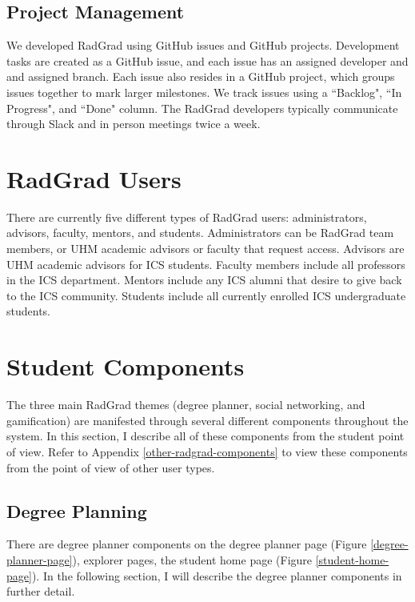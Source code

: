 \subsection{Project Management}

We developed RadGrad using GitHub issues and GitHub projects. Development tasks are created as a GitHub issue, and each issue has an assigned developer and and assigned branch. Each issue also resides in a GitHub project, which groups issues together to mark larger milestones. We track issues using a ``Backlog", ``In Progress", and ``Done" column. The RadGrad developers typically communicate through Slack and in person meetings twice a week. 

\section{RadGrad Users}

There are currently five different types of RadGrad users: administrators, advisors, faculty, mentors, and students. Administrators can be RadGrad team members, or UHM academic advisors or faculty that request access. Advisors are UHM academic advisors for ICS students. Faculty members include all professors in the ICS department. Mentors include any ICS alumni that desire to give back to the ICS community. Students include all currently enrolled ICS undergraduate students. 

\section{Student Components}

The three main RadGrad themes (degree planner, social networking, and gamification) are manifested through several different components throughout the system. In this section, I describe all of these components from the student point of view. Refer to Appendix \ref{other-radgrad-components} to view these components from the point of view of other user types.

\subsection{Degree Planning}

There are degree planner components on the degree planner page (Figure \ref{degree-planner-page}), explorer pages, the student home page (Figure \ref{student-home-page}). In the following section, I will describe the degree planner components in further detail. 

